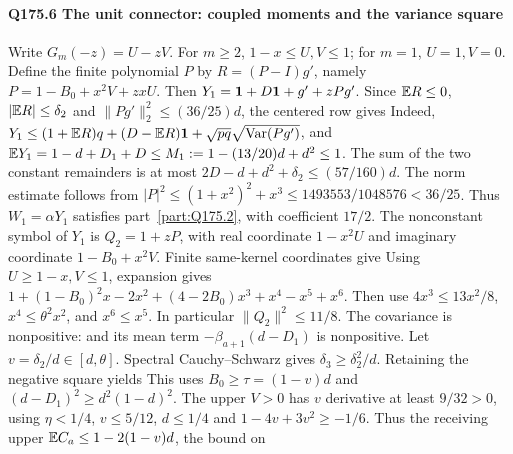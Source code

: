 \paragraph{Q175.6 The unit connector: coupled moments and the variance square}\label{part:Q175.6}
Write $G_m(-z)=\allowbreak U-zV$. For $m\ge\allowbreak 2$, $1-x\le\allowbreak  U,\allowbreak V\le\allowbreak 1$;
for $m=\allowbreak 1$, $U=\allowbreak 1,\allowbreak V=\allowbreak 0$. Define the finite polynomial $P$ by
$R=\allowbreak (P-I)g'$, namely
$P=\allowbreak 1-B_0+x^2V+zxU$. Then $Y_1=\allowbreak \mathbf1+D\mathbf1+g'+zPg'$.
Since $\mathbb E R\le\allowbreak 0$, $|\mathbb E R|\le\allowbreak \delta_2$ and
$\|Pg'\|_2^2\le\allowbreak (36/25)d$, the centered row gives
Indeed,
$Y_1\le\allowbreak (1+\mathbb E R)q+(D-\mathbb E R)\mathbf1+\sqrt{pq}\sqrt{\operatorname{Var}(Pg')}$,
and $\mathbb E Y_1=\allowbreak 1-d+D_1+D\le\allowbreak  M_1:=\allowbreak 1-(13/20)d+d^2\le\allowbreak 1$.
The sum of the two constant remainders is at most
$2D-d+d^2+\delta_2\le\allowbreak (57/160)d$. The norm estimate follows from
$|P|^2\le\allowbreak (1+x^2)^2+x^3\le\allowbreak 1493553/1048576<\allowbreak 36/25$.
Thus $W_1=\allowbreak \alpha Y_1$ satisfies part~\ref{part:Q175.2}, with coefficient
$17/2$.
The nonconstant symbol of $Y_1$ is $Q_2=\allowbreak 1+zP$, with real coordinate
$1-x^2U$ and imaginary coordinate $1-B_0+x^2V$. Finite same-kernel
coordinates give
Using $U\ge\allowbreak 1-x,\allowbreak V\le\allowbreak 1$, expansion gives
$1+(1-B_0)^2x-2x^2+(4-2B_0)x^3+x^4-x^5+x^6$.
Then use $4x^3\le\allowbreak 13x^2/8$, $x^4\le\allowbreak \theta^2x^2$, and $x^6\le\allowbreak  x^5$.
In particular $\|Q_2\|^2\le\allowbreak 11/8$.
The covariance is nonpositive:
and its mean term $-\beta_{a+1}(d-D_1)$ is nonpositive.
Let $v=\allowbreak \delta_2/d\in[d,\allowbreak \theta]$. Spectral Cauchy--Schwarz gives
$\delta_3\ge\allowbreak \delta_2^2/d$. Retaining the negative square yields
This uses $B_0\ge\allowbreak \tau=\allowbreak (1-v)d$ and
$(d-D_1)^2\ge\allowbreak  d^2(1-d)^2$. The upper $V>\allowbreak 0$ has $v$ derivative at
least $9/32>\allowbreak 0$, using $\eta<\allowbreak 1/4$, $v\le\allowbreak 5/12$, $d\le\allowbreak 1/4$ and
$1-4v+3v^2\ge\allowbreak -1/6$.
Thus the receiving upper $\mathbb E C_a\le\allowbreak 1-2(1-v)d$, the bound on

